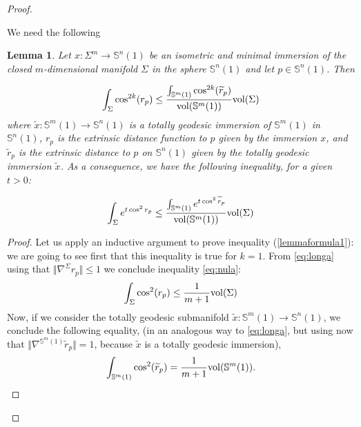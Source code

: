 \documentclass{amsart}
\newtheorem{lemma}[theorem]{Lemma}
\theoremstyle{definition}
\theoremstyle{remark}
\newcommand{\ese}{\mathbb{S}}
\begin{document}
\begin{proof}\

We need the following 


\begin{lemma}\label{keylemaimm}
Let  $x: \Sigma^m \to \mathbb{S}^n(1)$ be an isometric and minimal immersion of the closed $m$-dimensional manifold $\Sigma$ in the sphere  $\mathbb{S}^n(1)$ and let $p\in \mathbb{S}^n(1)$. Then

\begin{equation}\label{lemmaformula1}
\int_\Sigma \cos^{2k}(r_p) \leq \frac{\int_{\mathbb{S}^m(1)} \cos^{2k}(\widetilde{r}_p)}{{\rm vol}(\mathbb{S}^m(1))} {\rm vol}(\Sigma)
\end{equation}
where $\widetilde{x}: \mathbb{S}^m(1) \rightarrow \mathbb{S}^n(1)$ is a totally geodesic immersion of $\ese^m(1)$ in $\ese^n(1)$, $r_p$ is the extrinsic distance function to $p$ given by the immersion $x$, and $\widetilde{r}_p$ is the extrinsic distance to $p$ on $\ese^n(1)$ given by the totally geodesic immersion $\widetilde{x}$. As a consequence, we have the following inequality,  for a given $t>0$:

\begin{equation}\label{lemmaformula2}
\int_{\Sigma} e^{t \cos^2r_p}  \leq\frac{\int_{\ese^m(1)} e^{t \cos^2\widetilde{r}_p}}{{\rm vol}(\mathbb{S}^m(1))} {\rm vol}(\Sigma)
\end{equation}
\end{lemma}
\begin{proof}

Let us apply an inductive argument to prove inequality (\ref{lemmaformula1}): we are going to see first that this inequality is true for $k=1$.  From \eqref{eq:longa} using that $\Vert \nabla^\Sigma r_p\Vert\leq 1$ we conclude inequality \eqref{eq:nula}:
$$
\int_\Sigma \cos^2(r_p) \leq \frac{1}{m+1} {\rm vol}(\Sigma)
$$
Now, if we consider the totally geodesic submanifold $\widetilde{x}: \mathbb{S}^m(1) \rightarrow \mathbb{S}^n(1)$, we conclude the following equality, (in an analogous way  to \eqref{eq:longa}, but using now that $\Vert\nabla^{\mathbb{S}^m(1)} \widetilde{r}_p\Vert=1$, because $\widetilde{x}$ is a totally geodesic immersion), 
\begin{equation}\label{eqcinc}
\int_{\mathbb{S}^m(1)} \cos^2(\widetilde{r}_p) = \frac{1}{m+1} {\rm vol}(\mathbb{S}^m(1)).
\end{equation}


\end{proof}
\end{proof}
\end{document}
